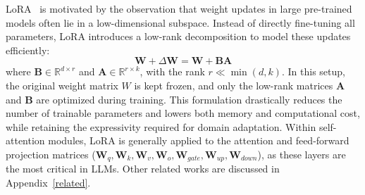 LoRA~\citep{lora} is motivated by the observation that weight updates in large pre-trained models often lie in a low-dimensional subspace. Instead of directly fine-tuning all parameters, LoRA introduces a low-rank decomposition to model these updates efficiently:
\begin{equation}
    \mathbf{W} + \Delta \mathbf{W} = \mathbf{W} + \mathbf{B}\mathbf{A}
\end{equation}
where $\mathbf{B} \in \mathbb{R}^{d \times r}$ and $\mathbf{A}\in \mathbb{R}^{r \times k}$, with the rank $r \ll \min(d, k)$. In this setup, the original weight matrix $W$ is kept frozen, and only the low-rank matrices $\mathbf{A}$ and $\mathbf{B}$ are optimized during training. This formulation drastically reduces the number of trainable parameters and lowers both memory and computational cost, while retaining the expressivity required for domain adaptation. Within self-attention modules, LoRA is generally applied to the attention and  feed-forward projection matrices ($\mathbf{W}_q, \mathbf{W}_k, \mathbf{W}_v, \mathbf{W}_o, \mathbf{W}_{gate}, \mathbf{W}_{up}, \mathbf{W}_{down}$), as these layers are the most critical in LLMs. Other related works are discussed in Appendix~\ref{related}.


